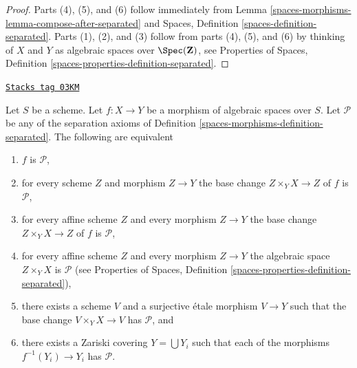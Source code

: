 \begin{proof}
Parts (4), (5), and (6) follow immediately from
Lemma \ref{spaces-morphisms-lemma-compose-after-separated}
and
Spaces, Definition \ref{spaces-definition-separated}.
Parts (1), (2), and (3) follow from parts (4), (5), and (6) by
thinking of $X$ and $Y$ as algebraic spaces over
$\Spec(\mathbf{Z})$, see
Properties of Spaces, Definition \ref{spaces-properties-definition-separated}.
\end{proof}

\begin{lemma}
\label{spaces-morphisms-lemma-separated-local}
\href{https://stacks.math.columbia.edu/tag/03KM}{\texttt{Stacks tag 03KM}}

Let $S$ be a scheme.
Let $f : X \to Y$ be a morphism of algebraic spaces over $S$.
Let $\mathcal{P}$ be any of the separation
axioms of Definition \ref{spaces-morphisms-definition-separated}.
The following are equivalent
\begin{enumerate}
\item $f$ is $\mathcal{P}$,
\item for every scheme $Z$ and morphism $Z \to Y$ the
base change $Z \times_Y X \to Z$ of $f$ is $\mathcal{P}$,
\item for every affine scheme $Z$ and every morphism $Z \to Y$ the
base change $Z \times_Y X \to Z$ of $f$ is $\mathcal{P}$,
\item for every affine scheme $Z$ and every morphism $Z \to Y$ the
algebraic space $Z \times_Y X$ is $\mathcal{P}$ (see
Properties of Spaces, Definition \ref{spaces-properties-definition-separated}),
\item there exists a scheme $V$ and a surjective \'etale morphism
$V \to Y$ such that the base change $V \times_Y X \to V$ has
$\mathcal{P}$, and
\item there exists a Zariski covering $Y = \bigcup Y_i$ such that each
of the morphisms $f^{-1}(Y_i) \to Y_i$ has $\mathcal{P}$.
\end{enumerate}
\end{lemma}

